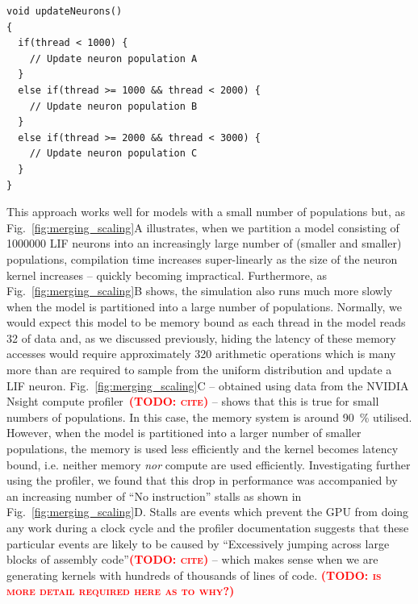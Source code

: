 \documentclass[9pt,twocolumn,twoside,lineno]{pnas-new}
\newcommand{\todo}[1]{\textbf{\textsc{\textcolor{red}{(TODO: #1)}}}}
\begin{document}
\begin{lstlisting}
void updateNeurons()
{
  if(thread < 1000) {
    // Update neuron population A
  }
  else if(thread >= 1000 && thread < 2000) {
    // Update neuron population B
  }
  else if(thread >= 2000 && thread < 3000) {
    // Update neuron population C
  }
}

\end{lstlisting}
%
This approach works well for models with a small number of populations but, as Fig.~\ref{fig:merging_scaling}A illustrates, when we partition a model consisting of \num{1000000} LIF neurons into an increasingly large number of (smaller and smaller) populations, compilation time increases super-linearly as the size of the neuron kernel increases -- quickly becoming impractical.
Furthermore, as Fig.~\ref{fig:merging_scaling}B shows, the simulation also runs much more slowly when the model is partitioned into a large number of populations.
Normally, we would expect this model to be memory bound as each thread in the model reads \SI{32}{\byte} of data and, as we discussed previously, hiding the latency of these memory accesses would require approximately 320 arithmetic operations which is many more than are required to sample from the uniform distribution and update a LIF neuron.
Fig.~\ref{fig:merging_scaling}C -- obtained using data from the NVIDIA Nsight compute profiler~\todo{cite} -- shows that this is true for small numbers of populations.
In this case, the memory system is around \SI{90}{\percent} utilised.
However, when the model is partitioned into a larger number of smaller populations, the memory is used less efficiently and the kernel becomes latency bound, i.e. neither memory \emph{nor} compute are used efficiently.
Investigating further using the profiler, we found that this drop in performance was accompanied by an increasing number of ``No instruction'' stalls as shown in Fig.~\ref{fig:merging_scaling}D.
Stalls are events which prevent the GPU from doing any work during a clock cycle and the profiler documentation suggests that these particular events are likely to be caused by ``Excessively jumping across large blocks of assembly code''\todo{cite} -- which makes sense when we are generating kernels with hundreds of thousands of lines of code.
\todo{is more detail required here as to why?}
\end{document}

